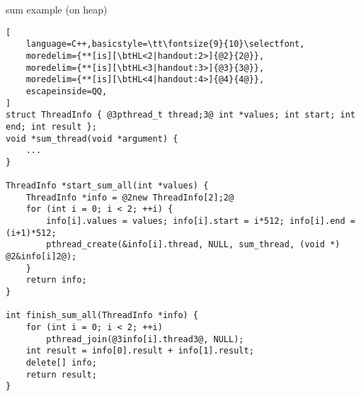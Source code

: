\begin{frame}[fragile,label=sumAllHeap]{sum example (on heap)}
\begin{lstlisting}[
    language=C++,basicstyle=\tt\fontsize{9}{10}\selectfont,
    moredelim={**[is][\btHL<2|handout:2>]{@2}{2@}},
    moredelim={**[is][\btHL<3|handout:3>]{@3}{3@}},
    moredelim={**[is][\btHL<4|handout:4>]{@4}{4@}},
    escapeinside=QQ,
]
struct ThreadInfo { @3pthread_t thread;3@ int *values; int start; int end; int result };
void *sum_thread(void *argument) {
    ...
}

ThreadInfo *start_sum_all(int *values) {
    ThreadInfo *info = @2new ThreadInfo[2];2@
    for (int i = 0; i < 2; ++i) {
        info[i].values = values; info[i].start = i*512; info[i].end = (i+1)*512;
        pthread_create(&info[i].thread, NULL, sum_thread, (void *) @2&info[i]2@);
    }
    return info;
}

int finish_sum_all(ThreadInfo *info) {
    for (int i = 0; i < 2; ++i)
        pthread_join(@3info[i].thread3@, NULL);
    int result = info[0].result + info[1].result;
    delete[] info;
    return result;
}
\end{lstlisting}
\end{frame}

